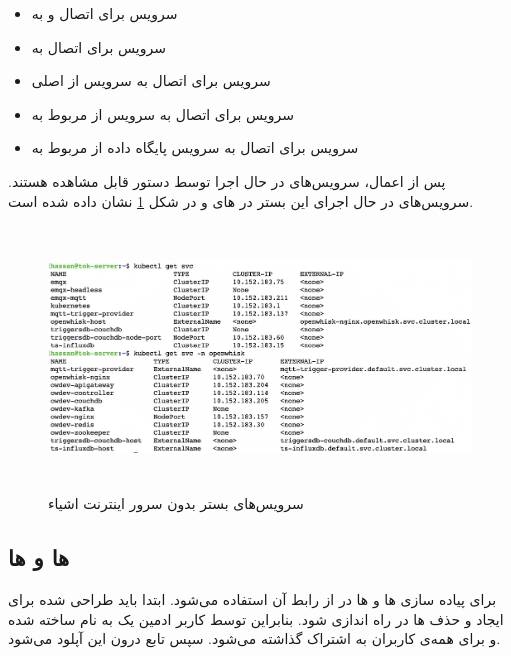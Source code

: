 \begin{itemize}

	\item سرویس  برای اتصال  و  به 
	
	\item سرویس  برای اتصال به 
	
	\item سرویس  برای اتصال به سرویس  از  اصلی
	
	\item سرویس  برای اتصال به سرویس  از  مربوط به 
	
	\item سرویس  برای اتصال به سرویس پایگاه داده  از  مربوط به 

\end{itemize}

پس از اعمال، سرویس‌های در حال اجرا توسط دستور  قابل مشاهده هستند. سرویس‌های در حال اجرای این بستر در  های  و  در شکل \ref{kubectl-svc} نشان داده شده است.

\begin{figure}[!h]
	\centering
	\includegraphics[height=7cm]{images/kubectl-svc}
	\caption{سرویس‌های بستر بدون سرور اینترنت اشیاء}
	\label{kubectl-svc}
\end{figure}

\subsection{ ها و  ها}

برای پیاده سازی  ها و  ها در  از رابط  آن استفاده می‌شود. ابتدا باید  طراحی شده برای ایجاد و حذف  ها در  راه اندازی شود. بنابراین توسط کاربر ادمین  یک  به نام  ساخته شده و برای همه‌ی کاربران به اشتراک گذاشته می‌شود. سپس تابع  درون این  آپلود می‌شود.

